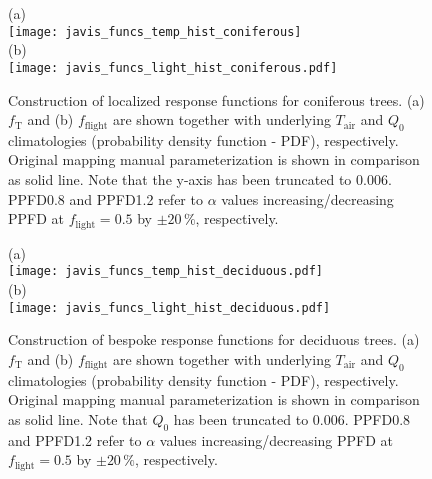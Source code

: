 \documentclass[bg, manuscript]{copernicus}
\begin{document}
\begin{figure}[t]
  \centering
  (a)\\
  \texttt{[image: javis\_funcs\_temp\_hist\_coniferous]}\\
  (b)\\
  \texttt{[image: javis\_funcs\_light\_hist\_coniferous.pdf]}
\caption{Construction of localized response functions for coniferous trees. (a) $f_\mathrm{T}$ and (b) $f_\mathrm{flight}$ are shown together with underlying $T_\mathrm{air}$ and $Q_0$ climatologies (probability density function - PDF), respectively. Original mapping manual parameterization is shown in comparison as solid line. Note that the y-axis has been truncated to $0.006$. PPFD0.8 and PPFD1.2 refer to $\alpha$ values increasing/decreasing PPFD at $f_\mathrm{light}=0.5$ by $\pm 20\,\%$, respectively.}
\label{fig:f_temp_spruce}
\end{figure}

\begin{figure}[t]
  \centering
  (a)\\
  \texttt{[image: javis\_funcs\_temp\_hist\_deciduous.pdf]}\\
  (b)\\
  \texttt{[image: javis\_funcs\_light\_hist\_deciduous.pdf]}
\caption{Construction of bespoke response functions for deciduous trees. (a) $f_\mathrm{T}$ and (b) $f_\mathrm{flight}$ are shown together with underlying $T_\mathrm{air}$ and $Q_0$ climatologies (probability density function - PDF), respectively. Original mapping manual parameterization is shown in comparison as solid line. Note that $Q_0$ has been truncated to $0.006$. PPFD0.8 and PPFD1.2 refer to $\alpha$ values increasing/decreasing PPFD at $f_\mathrm{light}=0.5$ by $\pm 20\,\%$, respectively.}
\label{fig:f_temp_birch}
\end{figure}

\clearpage

\noappendix       %


\end{document}
